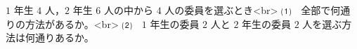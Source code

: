 $1$ 年生 $4$ 人，$2$ 年生 $6$ 人の中から $4$ 人の委員を選ぶとき<br>
⑴　全部で何通りの方法があるか。<br>
⑵　$1$ 年生の委員 $2$ 人と $2$ 年生の委員 $2$ 人を選ぶ方法は何通りあるか。
